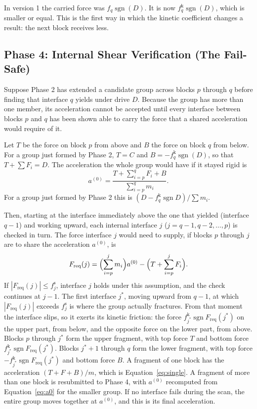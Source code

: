 \documentclass[11pt,a4paper]{article}
\newcommand{\fs}{f^{\mathrm{s}}}
\newcommand{\fkin}{f^{\mathrm{k}}}
\DeclareMathOperator{\sgn}{sgn}
\newcommand{\Freq}{F_{\mathrm{req}}}
\begin{document}
In version 1 the carried force was $f_q\sgn(D)$. It is now $\fkin_q\sgn(D)$, which is smaller or equal. This is the first way in which the kinetic coefficient changes a result: the next block receives less.

\subsection{Phase 4: Internal Shear Verification (The Fail-Safe)}

Suppose Phase 2 has extended a candidate group across blocks $p$ through $q$ before finding that interface $q$ yields under drive $D$. Because the group has more than one member, its acceleration cannot be accepted until every interface between blocks $p$ and $q$ has been shown able to carry the force that a shared acceleration would require of it.

Let $T$ be the force on block $p$ from above and $B$ the force on block $q$ from below. For a group just formed by Phase 2, $T=C$ and $B=-\fkin_q\sgn(D)$, so that $T+\sum F_i=D$. The acceleration the whole group would have if it stayed rigid is
\begin{equation}\label{eq:a0}
a^{(0)}=\frac{T+\sum_{i=p}^{q}F_i+B}{\sum_{i=p}^{q}m_i}.
\end{equation}
For a group just formed by Phase 2 this is $(D-\fkin_q\sgn D)/\sum m_i$.

Then, starting at the interface immediately above the one that yielded (interface $q-1$) and working upward, each internal interface $j$ ($j=q-1,q-2,\dots,p$) is checked in turn. The force interface $j$ would need to supply, if blocks $p$ through $j$ are to share the acceleration $a^{(0)}$, is
\begin{equation}\label{eq:Freq}
\Freq(j)=\Bigl(\sum_{i=p}^{j}m_i\Bigr)a^{(0)}-\Bigl(T+\sum_{i=p}^{j}F_i\Bigr).
\end{equation}
If $|\Freq(j)|\le \fs_j$, interface $j$ holds under this assumption, and the check continues at $j-1$. The first interface $j^{*}$, moving upward from $q-1$, at which $|\Freq(j)|$ exceeds $\fs_j$ is where the group actually fractures. From that moment the interface slips, so it exerts its kinetic friction: the force $\fkin_{j^*}\sgn\Freq(j^*)$ on the upper part, from below, and the opposite force on the lower part, from above. Blocks $p$ through $j^{*}$ form the upper fragment, with top force $T$ and bottom force $\fkin_{j^*}\sgn\Freq(j^*)$. Blocks $j^{*}+1$ through $q$ form the lower fragment, with top force $-\fkin_{j^*}\sgn\Freq(j^*)$ and bottom force $B$. A fragment of one block has the acceleration $(T+F+B)/m$, which is Equation~\eqref{eq:single}. A fragment of more than one block is resubmitted to Phase 4, with $a^{(0)}$ recomputed from Equation~\eqref{eq:a0} for the smaller group. If no interface fails during the scan, the entire group moves together at $a^{(0)}$, and this is its final acceleration.
\end{document}
